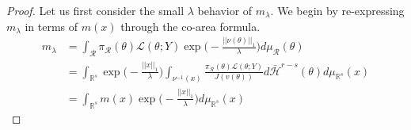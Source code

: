 \documentclass[10pt,fleqn]{article}
\newcommand{\bb}[1]{\mathbb{#1}} \newcommand{\mc}[1]{\mathcal{#1}}
\DeclareMathOperator{\1}{\mathbbm{1}} \DeclareMathOperator{\bigO}{\mc O}
\begin{document}
\begin{proof}
%
%
%
%
%
Let us first consider the small $\lambda$ behavior of $m_\lambda.$ We begin by re-expressing $m_\lambda$ in terms of $m(x)$ through the co-area formula.
\begin{align*}
m_\lambda &= \int_\mathcal{R} \pi_\mathcal{R}(\theta) \mathcal{L}(\theta;Y) \exp\bigg(-\frac{||\nu(\theta)||_1}{\lambda}\bigg) d\mu_\mathcal{R}(\theta) \\
&= \int_{\mathbb{R}^s} \exp\bigg(-\frac{||x||_1}{\lambda}\bigg) \int_{\nu^{-1}(x)} \frac{\pi_\mathcal{R}(\theta) \mathcal{L}(\theta;Y)}{J(v(\theta))} d\bar{\mathcal{H}}^{r-s}(\theta) d\mu_{\mathbb{R}^s} (x) \\
&=\int_{\mathbb{R}^s}m(x) \exp\bigg(-\frac{||x||_1}{\lambda}\bigg)d\mu_{\mathbb{R}^s}(x)
\end{align*}


\end{proof}
\end{document}
